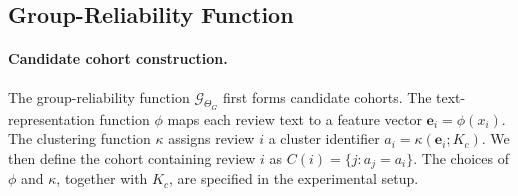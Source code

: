 \documentclass[runningheads]{llncs}
\begin{document}
\subsection{Group-Reliability Function}

\paragraph{Candidate cohort construction.}
The group-reliability function \(\mathcal{G}_{\Theta_G}\) first forms candidate cohorts. The text-representation function \(\phi\) maps each review text to a feature vector \(\mathbf{e}_i=\phi(x_i)\). The clustering function \(\kappa\) assigns review \(i\) a cluster identifier \(a_i=\kappa(\mathbf{e}_i;K_c)\). We then define the cohort containing review \(i\) as \(C(i)=\{j:a_j=a_i\}\). The choices of \(\phi\) and \(\kappa\), together with \(K_c\), are specified in the experimental setup.
\end{document}
